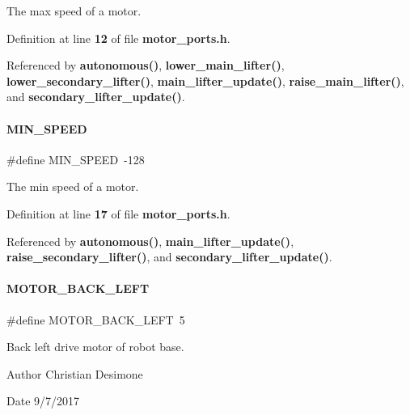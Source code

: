 The max speed of a motor. 



Definition at line \textbf{ 12} of file \textbf{ motor\+\_\+ports.\+h}.



Referenced by \textbf{ autonomous()}, \textbf{ lower\+\_\+main\+\_\+lifter()}, \textbf{ lower\+\_\+secondary\+\_\+lifter()}, \textbf{ main\+\_\+lifter\+\_\+update()}, \textbf{ raise\+\_\+main\+\_\+lifter()}, and \textbf{ secondary\+\_\+lifter\+\_\+update()}.

\mbox{\label{motor__ports_8h_ad5f5efaa5cb771bd06da4bfe6046809e}} 
\paragraph{M\+I\+N\+\_\+\+S\+P\+E\+ED}
{\footnotesize\ttfamily \#define M\+I\+N\+\_\+\+S\+P\+E\+ED~-\/128}



The min speed of a motor. 



Definition at line \textbf{ 17} of file \textbf{ motor\+\_\+ports.\+h}.



Referenced by \textbf{ autonomous()}, \textbf{ main\+\_\+lifter\+\_\+update()}, \textbf{ raise\+\_\+secondary\+\_\+lifter()}, and \textbf{ secondary\+\_\+lifter\+\_\+update()}.

\mbox{\label{motor__ports_8h_a36e9fda07b5cd4408170fe907b75a8b7}} 
\paragraph{M\+O\+T\+O\+R\+\_\+\+B\+A\+C\+K\+\_\+\+L\+E\+FT}
{\footnotesize\ttfamily \#define M\+O\+T\+O\+R\+\_\+\+B\+A\+C\+K\+\_\+\+L\+E\+FT~5}



Back left drive motor of robot base. 

\begin{DoxyAuthor}{Author}
Christian Desimone 
\end{DoxyAuthor}
\begin{DoxyDate}{Date}
9/7/2017 
\end{DoxyDate}


